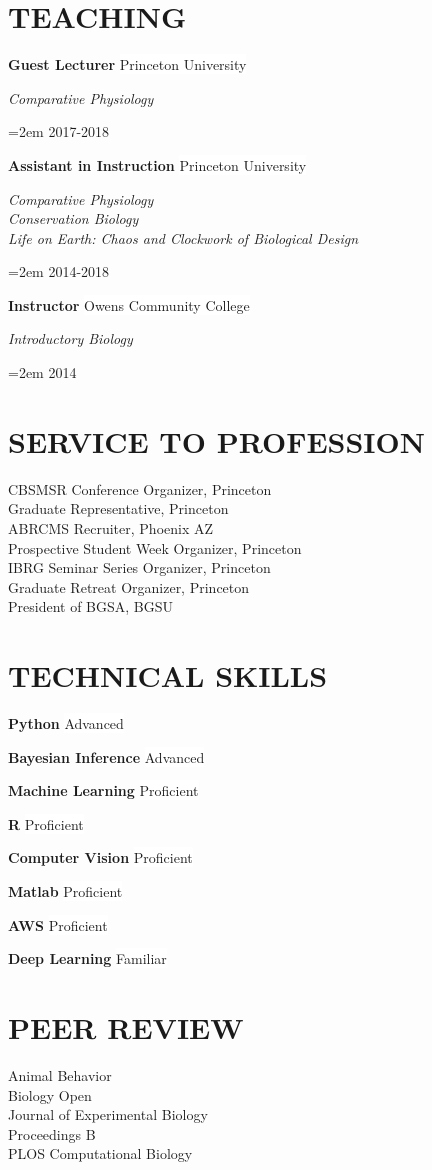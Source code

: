 \documentclass[paper=a4,fontsize=11pt]{scrartcl}	 			%
\newcommand{\NewPart}[1]{\section*{\uppercase{#1}}}
\newcommand{\EducationEntry}[4]{
		\noindent \textbf{#1} \hfill 					%
		\colorbox{White}{%
			\parbox{10em}{%
			\hfill\color{Black}#2}} \par				%
		\noindent \textit{#3} \par					%
		\noindent\hangindent=2em\hangafter=0 \small #4 	%
		\normalsize \par}
\newcommand{\WorkEntry}[4]{						%
		\noindent \textbf{#1} \hfill 					%
		\colorbox{White}{\color{Black}#2} \par		%
		\noindent \textit{#3} \par					%
		\noindent\hangindent=2em\hangafter=0 \small #4 	%
		\normalsize \par}
\newcommand{\codeEntry}[2]{						%
		\noindent \textbf{#1} \hfill 					%
		\colorbox{White}{\color{Black}#2} \par		%
		}
\begin{document}
\NewPart{Teaching}{}
\WorkEntry{Guest Lecturer}{Princeton University}{Comparative Physiology}{2017-2018}
\WorkEntry{Assistant in Instruction}{Princeton University}{Comparative Physiology\\Conservation Biology \\ Life on Earth: Chaos and Clockwork of Biological Design}{2014-2018}
\WorkEntry{Instructor}{Owens Community College}{Introductory Biology}{2014}



\NewPart{Service to Profession}{}
CBSMSR Conference Organizer, Princeton \\
Graduate Representative, Princeton\\
ABRCMS Recruiter, Phoenix AZ\\
Prospective Student Week Organizer, Princeton \\
IBRG Seminar Series Organizer, Princeton\\
Graduate Retreat Organizer, Princeton\\
President of BGSA, BGSU\\

\NewPart{Technical Skills}
\codeEntry{Python}{Advanced}
\codeEntry{Bayesian Inference}{Advanced}
\codeEntry{Machine Learning}{Proficient}
\codeEntry{R}{Proficient}
\codeEntry{Computer Vision}{Proficient}
\codeEntry{Matlab}{Proficient}
\codeEntry{AWS}{Proficient}
\codeEntry{Deep Learning}{Familiar}

\NewPart{Peer review}{}
Animal Behavior\\
Biology Open \\
Journal of Experimental Biology\\
Proceedings B\\
PLOS Computational Biology\\
\end{document}
